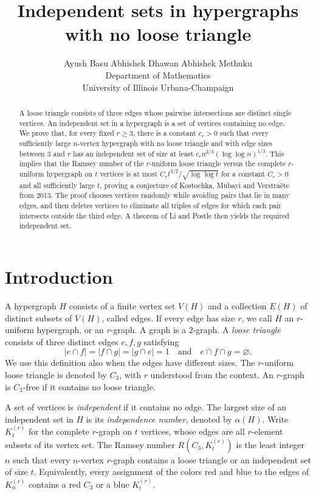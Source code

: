 \documentclass[11pt]{article}
\title{Independent sets in hypergraphs with no loose triangle}
\author{Ayush Basu \qquad Abhishek Dhawan \qquad Abhishek Methuku\\[0.5em]
\small Department of Mathematics\\
\small University of Illinois Urbana-Champaign}
\date{}
\numberwithin{equation}{section}
\theoremstyle{remark}
\begin{document}
\maketitle
\begin{abstract}
A loose triangle consists of three edges whose pairwise intersections are distinct single vertices. An independent set in a hypergraph is a set of vertices containing no edge. We prove that, for every fixed $r\ge3$, there is a constant $c_r>0$ such that every sufficiently large $n$-vertex hypergraph with no loose triangle and with edge sizes between $3$ and $r$ has an independent set of size at least $c_r n^{2/3}(\log\log n)^{1/3}$. This implies that the Ramsey number of the $r$-uniform loose triangle versus the complete $r$-uniform hypergraph on $t$ vertices is at most $C_r t^{3/2}/\sqrt{\log\log t}$ for a constant $C_r>0$ and all sufficiently large $t$, proving a conjecture of Kostochka, Mubayi and Verstra\"ete from 2013. The proof chooses vertices randomly while avoiding pairs that lie in many edges, and then deletes vertices to eliminate all triples of edges for which each pair intersects outside the third edge. A theorem of Li and Postle then yields the required independent set.
\end{abstract}

\section{Introduction}

A hypergraph $H$ consists of a finite vertex set $V(H)$ and a collection $E(H)$ of distinct subsets of $V(H)$, called edges. If every edge has size $r$, we call $H$ an $r$-uniform hypergraph, or an $r$-graph. A graph is a $2$-graph. A \emph{loose triangle} consists of three distinct edges $e,f,g$ satisfying
\[
 |e\cap f|=|f\cap g|=|g\cap e|=1
 \quad\text{and}\quad e\cap f\cap g=\varnothing.
\]
We use this definition also when the edges have different sizes. The $r$-uniform loose triangle is denoted by $C_3$, with $r$ understood from the context. An $r$-graph is $C_3$-free if it contains no loose triangle.

A set of vertices is \emph{independent} if it contains no edge. The largest size of an independent set in $H$ is its \emph{independence number}, denoted by $\alpha(H)$. Write $K_t^{(r)}$ for the complete $r$-graph on $t$ vertices, whose edges are all $r$-element subsets of its vertex set. The Ramsey number $R(C_3,K_t^{(r)})$ is the least integer $n$ such that every $n$-vertex $r$-graph contains a loose triangle or an independent set of size $t$. Equivalently, every assignment of the colors red and blue to the edges of $K_n^{(r)}$ contains a red $C_3$ or a blue $K_t^{(r)}$.
\end{document}
